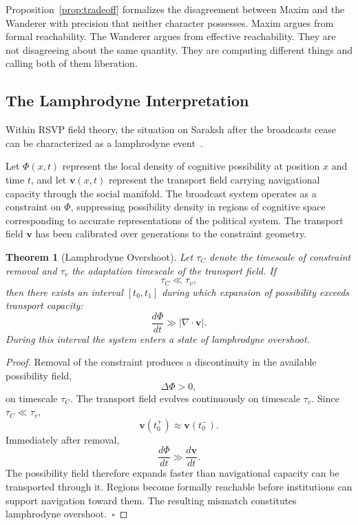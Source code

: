 \documentclass[12pt, a4paper]{article}
\theoremstyle{plain}
\newtheorem{theorem}{Theorem}[section]
\theoremstyle{definition}
\theoremstyle{remark}
\begin{document}
Proposition~\ref{prop:tradeoff} formalizes the
disagreement between Maxim and the Wanderer with
precision that neither character possesses. Maxim
argues from formal reachability. The Wanderer
argues from effective reachability. They are not
disagreeing about the same quantity. They are
computing different things and calling both of
them liberation.

\subsection{The Lamphrodyne Interpretation}

Within RSVP field theory, the situation on Saraksh
after the broadcasts cease can be characterized
as a lamphrodyne event~\cite{flyxion2026rsvp}.

Let $\Phi(x,t)$ represent the local density of
cognitive possibility at position $x$ and time $t$,
and let $\mathbf{v}(x,t)$ represent the transport
field carrying navigational capacity through the
social manifold. The broadcast system operates
as a constraint on $\Phi$, suppressing possibility
density in regions of cognitive space corresponding
to accurate representations of the political system.
The transport field $\mathbf{v}$ has been calibrated
over generations to the constraint geometry.

\begin{theorem}[Lamphrodyne Overshoot]
\label{thm:lamphrodyne}
Let $\tau_C$ denote the timescale of constraint
removal and $\tau_v$ the adaptation timescale
of the transport field. If
\[
\tau_C \ll \tau_v,
\]
then there exists an interval $[t_0, t_1]$ during
which expansion of possibility exceeds transport
capacity:
\[
\frac{d\Phi}{dt} \gg \left|\nabla \cdot \mathbf{v}\right|.
\]
During this interval the system enters a state of
lamphrodyne overshoot.
\end{theorem}

\begin{proof}
Removal of the constraint produces a discontinuity
in the available possibility field,
\[
\Delta\Phi > 0,
\]
on timescale $\tau_C$. The transport field evolves
continuously on timescale $\tau_v$. Since
$\tau_C \ll \tau_v$,
\[
\mathbf{v}(t_0^+) \approx \mathbf{v}(t_0^-).
\]
Immediately after removal,
\[
\frac{d\Phi}{dt} \gg \frac{d\mathbf{v}}{dt}.
\]
The possibility field therefore expands faster
than navigational capacity can be transported
through it. Regions become formally reachable
before institutions can support navigation toward
them. The resulting mismatch constitutes
lamphrodyne overshoot.~$\square$
\end{proof}
\end{document}
